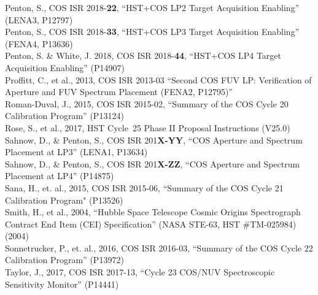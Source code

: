 \documentclass{stsci_report}
\newcommand{\pid}[1]{{\rm P}#1}
\begin{document}
Penton, S., COS ISR 2018-{\bf 22}, ``HST+COS LP2 Target Acquisition Enabling'' (LENA3, \pid{12797})\\
Penton, S., COS ISR 2018-{\bf 33}, ``HST+COS LP3 Target Acquisition Enabling'' (FENA4, \pid{13636})\\
Penton, S. \& White, J. 2018, COS ISR 2018-{\bf 44}, ``HST+COS LP4 Target Acquisition Enabling'' (\pid{14907})\\
Proffitt, C., et al., 2013, COS ISR 2013-03  ``Second COS FUV LP: Verification of Aperture and FUV Spectrum Placement (FENA2, \pid{12795})''\\
Roman-Duval, J., 2015, COS ISR 2015-02, ``Summary of the COS Cycle 20 Calibration Program'' (\pid{13124})\\
Rose, S., et al., 2017, HST Cycle~25 Phase II Proposal Instructions (V25.0)\\
Sahnow, D., \& Penton, S., COS ISR 201{\bf X-YY}, ``COS Aperture and Spectrum Placement at LP3'' (LENA1, \pid{13634})\\
Sahnow, D., \& Penton, S., COS ISR 201{\bf X-ZZ}, ``COS Aperture and Spectrum Placement at LP4'' (\pid{14875})\\
Sana, H., et. al., 2015, COS ISR 2015-06, ``Summary of the COS Cycle 21 Calibration Program" (\pid{13526})\\
Smith, H., et al., 2004, ``Hubble Space Telescope Cosmic Origins Spectrograph Contract End Item (CEI) Specification'' (NASA STE-63, HST \#TM-025984) (2004)\\
Sonnetrucker, P., et. al., 2016, COS ISR 2016-03, ``Summary of the COS Cycle 22 Calibration Program'' (\pid{13972}) \\
Taylor, J., 2017, COS ISR 2017-13, ``Cycle 23 COS/NUV Spectroscopic Sensitivity Monitor'' (\pid{14441})\\
\normalsize
\newpage
\clearpage
%
\end{document}
